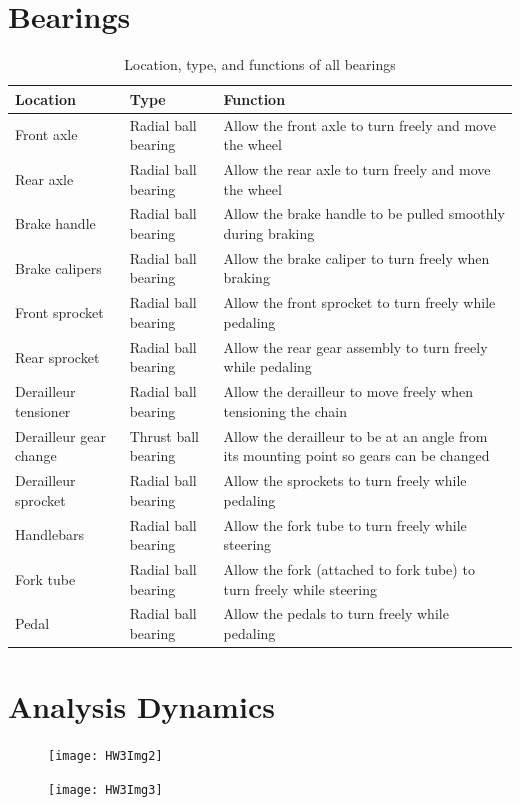 \documentclass[11pt]{article}
\begin{document}
\section*{Bearings}
\begin{table}[H]
	\centering
	\begin{tabular}{|l|l|p{3.5in}|}
		\hline
		\textbf{Location} & \textbf{Type} & \textbf{Function} \\
		\hline
		Front axle & Radial ball bearing & Allow the front axle to turn freely and move the wheel \\
		\hline
		Rear axle & Radial ball bearing & Allow the rear axle to turn freely and move the wheel \\
		\hline
		Brake handle & Radial ball bearing & Allow the brake handle to be pulled smoothly during braking \\
		\hline
		Brake calipers & Radial ball bearing & Allow the brake caliper to turn freely when braking \\
		\hline
		Front sprocket & Radial ball bearing & Allow the front sprocket to turn freely while pedaling \\
		\hline
		Rear sprocket & Radial ball bearing & Allow the rear gear assembly to turn freely while pedaling \\
		\hline
		Derailleur tensioner & Radial ball bearing & Allow the derailleur to move freely when tensioning the chain \\
		\hline
		Derailleur gear change & Thrust ball bearing & Allow the derailleur to be at an angle from its mounting point so gears can be changed \\
		\hline
		Derailleur sprocket & Radial ball bearing & Allow the sprockets to turn freely while pedaling \\
		\hline
		Handlebars & Radial ball bearing & Allow the fork tube to turn freely while steering \\
		\hline
		Fork tube & Radial ball bearing & Allow the fork (attached to fork tube) to turn freely while steering \\
		\hline
		Pedal & Radial ball bearing & Allow the pedals to turn freely while pedaling \\
		\hline
	\end{tabular}
	\caption{Location, type, and functions of all bearings}
\end{table}

\section*{Analysis Dynamics}
\begin{figure}[H]
	\centering
	\texttt{[image: HW3Img2]}
\end{figure}
\begin{figure}[H]
	\centering
	\texttt{[image: HW3Img3]}
\end{figure}
\end{document}
